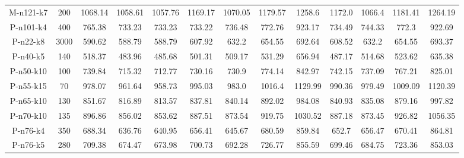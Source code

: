 \documentclass[11pt]{article} %
\begin{document}
\begin{enumerate}
\begin{landscape}
\begin{table}[p]
\begin{small}
\begin{tabular}{ccccccccccccc}
M-n121-k7&200&1068.14&1058.61&1057.76&1169.17&1070.05&1179.57&1258.6&1172.0&1066.4&1181.41&1264.19 \\ 
P-n101-k4&400&765.38&733.23&733.23&733.22&736.48&772.76&923.17&734.49&744.33&772.3&922.69 \\
P-n22-k8&3000&590.62&588.79&588.79&607.92&632.2&654.55&692.64&608.52&632.2&654.55&693.37 \\
P-n40-k5&140&518.37&483.96&485.68&501.31&509.17&531.29&656.94&487.17&514.68&523.62&635.38 \\
P-n50-k10&100&739.84&715.32&712.77&730.16&730.9&774.14&842.97&742.15&737.09&767.21&825.01 \\
P-n55-k15&70&978.07&961.64&958.73&995.03&983.0&1016.4&1129.99&990.36&979.49&1009.09&1120.39 \\ 
P-n65-k10&130&851.67&816.89&813.57&837.81&840.14&892.02&984.08&840.93&835.08&879.16&997.82 \\
P-n70-k10&135&896.86&856.02&853.62&887.51&873.54&919.75&1030.52&887.18&873.45&926.82&1056.35 \\
P-n76-k4&350&688.34&636.76&640.95&656.41&645.67&680.59&859.84&652.7&656.47&670.41&864.81 \\
P-n76-k5&280&709.38&674.47&673.98&700.73&692.28&726.77&855.59&699.46&684.75&723.36&853.03 \\
\bottomrule
\end{tabular}
\end{small}
\end{table}%


\end{landscape}
\end{enumerate}
\end{document}

